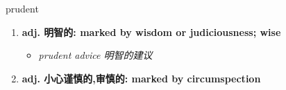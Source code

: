 
\begin{frame}
{\huge prudent}
\begin{center}
\begin{enumerate}\Large
  \item \textbf{adj. 明智的: marked by wisdom or judiciousness; wise}
  \begin{itemize}
    \item \em{\Large{prudent advice 明智的建议}}
  \end{itemize}
  \item \textbf{adj. 小心谨慎的,审慎的: marked by circumspection}
\end{enumerate}
\end{center}
\end{frame}
